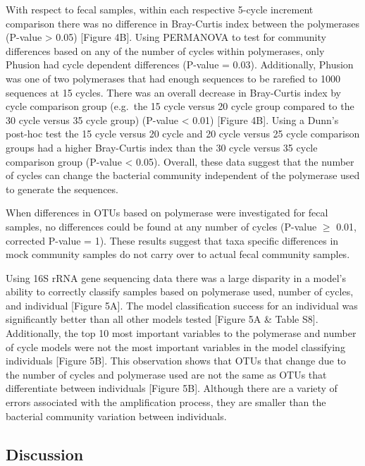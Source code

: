 \documentclass[11pt,]{article}
\begin{document}
With respect to fecal samples, within each respective 5-cycle increment
comparison there was no difference in Bray-Curtis index between the
polymerases (P-value \textgreater{} 0.05) {[}Figure 4B{]}. Using
PERMANOVA to test for community differences based on any of the number
of cycles within polymerases, only Phusion had cycle dependent
differences (P-value = 0.03). Additionally, Phusion was one of two
polymerases that had enough sequences to be rarefied to 1000 sequences
at 15 cycles. There was an overall decrease in Bray-Curtis index by
cycle comparison group (e.g.~the 15 cycle versus 20 cycle group compared
to the 30 cycle versus 35 cycle group) (P-value \textless{} 0.01)
{[}Figure 4B{]}. Using a Dunn's post-hoc test the 15 cycle versus 20
cycle and 20 cycle versus 25 cycle comparison groups had a higher
Bray-Curtis index than the 30 cycle versus 35 cycle comparison group
(P-value \textless{} 0.05). Overall, these data suggest that the number
of cycles can change the bacterial community independent of the
polymerase used to generate the sequences.

When differences in OTUs based on polymerase were investigated for fecal
samples, no differences could be found at any number of cycles (P-value
\(\geqslant\) 0.01, corrected P-value = 1). These results suggest that
taxa specific differences in mock community samples do not carry over to
actual fecal community samples.

Using 16S rRNA gene sequencing data there was a large disparity in a
model's ability to correctly classify samples based on polymerase used,
number of cycles, and individual {[}Figure 5A{]}. The model
classification success for an individual was significantly better than
all other models tested {[}Figure 5A \& Table S8{]}. Additionally, the
top 10 most important variables to the polymerase and number of cycle
models were not the most important variables in the model classifying
individuals {[}Figure 5B{]}. This observation shows that OTUs that
change due to the number of cycles and polymerase used are not the same
as OTUs that differentiate between individuals {[}Figure 5B{]}. Although
there are a variety of errors associated with the amplification process,
they are smaller than the bacterial community variation between
individuals.

\newpage

\subsection{Discussion}\label{discussion}
\end{document}
